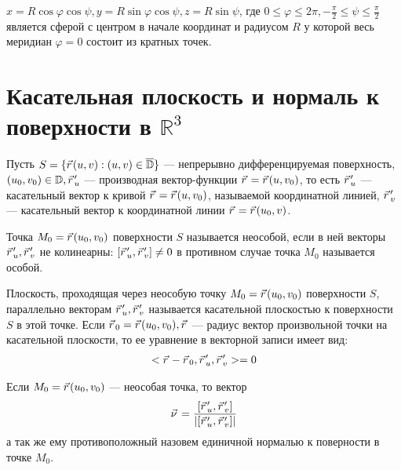 \begin{example}
  $x = R \cos \varphi \cos \psi, y = R \sin \varphi \cos \psi, z = R \sin
  \psi$, где $0 \leq \varphi \leq 2\pi, -\frac{\pi}{2} \leq \psi \leq
  \frac{\pi}{2}$ является сферой с центром в начале координат и радиусом $R$ у
  которой весь меридиан $\varphi = 0$ состоит из кратных точек.
\end{example}

\section{Касательная плоскость и нормаль к поверхности в $\mathbb{R}^3$}

Пусть $S = \{\pvec r(u, v) : (u, v) \in \overline{\mathbb{D}}\}$ --- непрерывно
дифференцируемая поверхность, $(u_0, v_0) \in \mathbb{D}, \pvec r_u'$ ---
производная вектор-функции $\pvec r = \pvec r(u, v_0)$, то есть $\pvec r_u'$ ---
касательный вектор к кривой $\pvec r = \pvec r(u, v_0)$, называемой координатной
линией, $\pvec r_v'$ --- касательный вектор к координатной линии $\pvec r = \pvec
r(u_0, v)$.

\begin{definition}
  Точка $M_0 = \pvec r(u_0, v_0)$ поверхности $S$ называется неособой, если в
  ней векторы $\pvec r_u', \pvec r_v'$ не колинеарны: $[\pvec r_u', \pvec r_v']
  \not = 0$ в противном случае точка $M_0$ называется особой.
\end{definition}

\begin{definition}
  Плоскость, проходящая через неособую точку $M_0 = \pvec r(u_0, v_0)$
  поверхности $S$, параллельно векторам $\pvec r_u', \pvec r_v'$ называется
  касательной плоскостью к поверхности $S$ в этой точке. Если $\pvec r_0 = \pvec
  r(u_0, v_0), \pvec r$ --- радиус вектор произвольной точки на касательной
  плоскости, то ее уравнение в векторной записи имеет вид:
  \begin{gather}
    < \pvec r - \pvec r_0, \pvec r_u', \pvec r_v' > = 0
  \end{gather}
\end{definition}

\begin{definition}
  Если $M_0 = \pvec r(u_0, v_0)$ --- неособая точка, то вектор
  \begin{gather}
    \pvec\nu = \frac{[\pvec r_u', \pvec r_v']}{\left|[\pvec r_u', \pvec
    r_v']\right|}
    \label{def723:eq1}
  \end{gather}
  а так же ему противоположный назовем единичной нормалью к поверности в точке
  $M_0$.
\end{definition}

